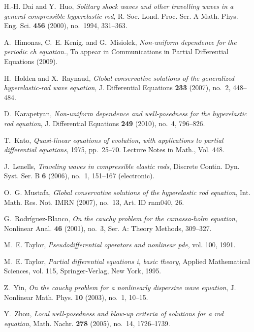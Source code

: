 \documentclass[12pt,reqno]{amsart}
\numberwithin{equation}{section}  %
\numberwithin{figure}{section}
\begin{document}
\begin{thebibliography}{HKM09}
H.-H. Dai and Y.~Huo, \emph{Solitary shock waves and other travelling waves in
  a general compressible hyperelastic rod}, R. Soc. Lond. Proc. Ser. A Math.
  Phys. Eng. Sci. \textbf{456} (2000), no.~1994, 331--363.

A.~Himonas, C.~E. Kenig, and G.~Misiolek, \emph{Non-uniform dependence for the
  periodic ch equation.}, To appear in Communications in Partial Differential
  Equations (2009).

H.~Holden and X.~Raynaud, \emph{Global conservative solutions of the
  generalized hyperelastic-rod wave equation}, J. Differential Equations
  \textbf{233} (2007), no.~2, 448--484.

D.~Karapetyan, \emph{Non-uniform dependence and well-posedness for the
  hyperelastic rod equation}, J. Differential Equations \textbf{249} (2010),
  no.~4, 796--826. 

T.~Kato, \emph{Quasi-linear equations of evolution, with applications to
  partial differential equations}, 1975, pp.~25--70. Lecture Notes in Math.,
  Vol. 448.

J.~Lenells, \emph{Traveling waves in compressible elastic rods}, Discrete
  Contin. Dyn. Syst. Ser. B \textbf{6} (2006), no.~1, 151--167 (electronic).

O.~G. Mustafa, \emph{Global conservative solutions of the hyperelastic rod
  equation}, Int. Math. Res. Not. IMRN (2007), no.~13, Art. ID rnm040, 26.

G.~Rodr\'iguez-Blanco, \emph{On the cauchy problem for the camassa-holm
  equation}, Nonlinear Anal. \textbf{46} (2001), no.~3, Ser. A: Theory Methods,
  309--327.

M.~E. Taylor, \emph{Pseudodifferential operators and nonlinear pde}, vol. 100,
  1991.

M.~E. Taylor, \emph{Partial differential equations i, basic theory}, Applied
  Mathematical Sciences, vol. 115, Springer-Verlag, New York, 1995.

Z.~Yin, \emph{On the cauchy problem for a nonlinearly dispersive wave
  equation}, J. Nonlinear Math. Phys. \textbf{10} (2003), no.~1, 10--15.

Y.~Zhou, \emph{Local well-posedness and blow-up criteria of solutions for a rod
  equation}, Math. Nachr. \textbf{278} (2005), no.~14, 1726--1739.

\end{thebibliography}
%
%
%
%
%
%
\end{document}
